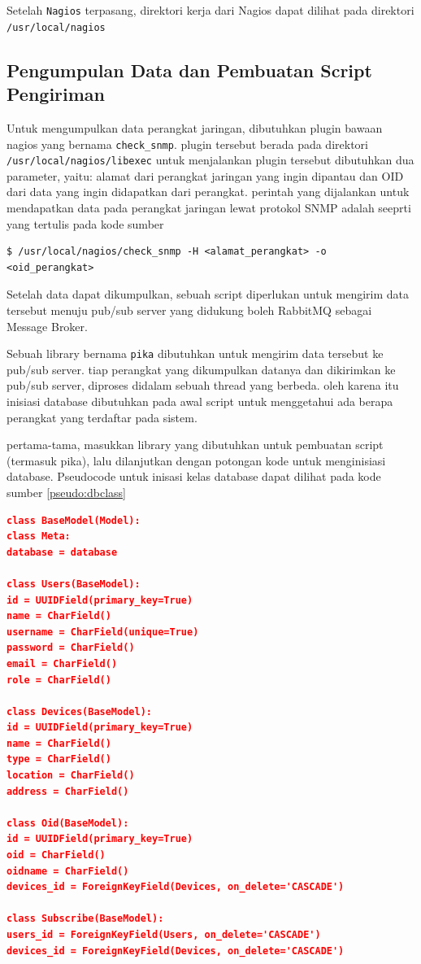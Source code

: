     			Setelah \texttt{Nagios} terpasang, direktori kerja dari Nagios dapat dilihat pada direktori \texttt{/usr/local/nagios}

			\subsection{Pengumpulan Data dan Pembuatan Script Pengiriman}
				Untuk mengumpulkan data perangkat jaringan, dibutuhkan plugin bawaan nagios yang bernama \texttt{check\_snmp}. plugin tersebut berada pada direktori \texttt{/usr/local/nagios/libexec} untuk menjalankan plugin tersebut dibutuhkan dua parameter, yaitu: alamat dari perangkat jaringan yang ingin dipantau dan OID dari data yang ingin didapatkan dari perangkat.
				perintah yang dijalankan untuk mendapatkan data pada perangkat jaringan lewat protokol SNMP adalah seeprti yang tertulis pada kode sumber 
				
\begin{lstlisting}[frame=single,breaklines,caption={Perintah Mengumpulkan Data Perangkat dengan SNMP},label=snmpcommand, captionpos=b]
$ /usr/local/nagios/check_snmp -H <alamat_perangkat> -o <oid_perangkat>
\end{lstlisting}
    			
    			Setelah data dapat dikumpulkan, sebuah script diperlukan untuk mengirim data tersebut menuju pub/sub server yang didukung boleh RabbitMQ sebagai Message Broker.
    			
    			Sebuah library bernama \texttt{pika} dibutuhkan untuk mengirim data tersebut ke pub/sub server. tiap perangkat yang dikumpulkan datanya dan dikirimkan ke pub/sub server, diproses didalam sebuah thread yang berbeda. oleh karena itu inisiasi database dibutuhkan pada awal script untuk menggetahui ada berapa perangkat yang terdaftar pada sistem.
    			
    			pertama-tama, masukkan library yang dibutuhkan untuk pembuatan script (termasuk pika), lalu dilanjutkan dengan potongan kode untuk menginisiasi database. Pseudocode untuk inisasi kelas database dapat dilihat pada kode sumber \ref{pseudo:dbclass}
    			
\begin{lstlisting}[frame=single,breaklines,caption={Pseudocode inisiasi Kelas Database},label=pseudo:dbclass, captionpos=b, language=json]
class BaseModel(Model):
class Meta:
database = database

class Users(BaseModel):
id = UUIDField(primary_key=True)
name = CharField()
username = CharField(unique=True)
password = CharField()
email = CharField()
role = CharField()

class Devices(BaseModel):
id = UUIDField(primary_key=True)
name = CharField()
type = CharField()
location = CharField()
address = CharField()

class Oid(BaseModel):
id = UUIDField(primary_key=True)
oid = CharField()
oidname = CharField()
devices_id = ForeignKeyField(Devices, on_delete='CASCADE')

class Subscribe(BaseModel):
users_id = ForeignKeyField(Users, on_delete='CASCADE')
devices_id = ForeignKeyField(Devices, on_delete='CASCADE')
\end{lstlisting}
    			
